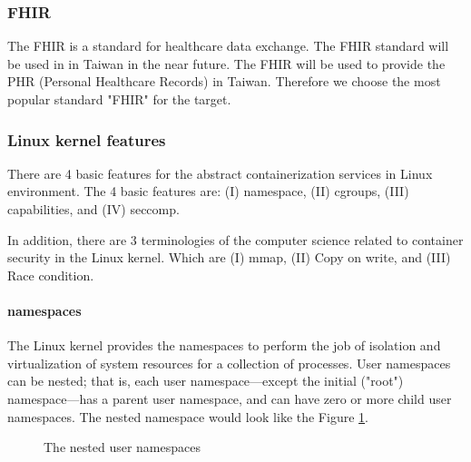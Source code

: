 \documentclass[12pt,a4paper]{IEEEconf}
\begin{document}
\subsubsection{FHIR}
The FHIR is a standard for healthcare data exchange. The FHIR standard will be used in
in Taiwan in the near future\cite{MOHW_FHIR}. The FHIR will be used to provide the PHR
(Personal Healthcare Records) in Taiwan. Therefore we choose the most popular standard
"FHIR" for the target.

\subsubsection{Linux kernel features}
There are 4 basic features for the abstract containerization services in Linux environment.
The 4 basic features are: (\RN{1}) namespace, (\RN{2}) cgroups, (\RN{3}) capabilities,
and (\RN{4}) seccomp.

In addition, there are 3 terminologies of the computer science related to container security in
the Linux kernel. Which are (\RN{1}) mmap, (\RN{2}) Copy on write, and (\RN{3}) Race condition.

\paragraph{namespaces}
The Linux kernel provides the namespaces to perform the job of isolation and virtualization
of system resources for a collection of processes\cite{Road_Ahead}.
User namespaces can be nested; that is, each user namespace—except the initial ("root")
namespace—has a parent user namespace, and can have zero or more child user namespaces.
\cite{user_namespaces}
The nested namespace would look like the Figure \ref*{Nested}.
\begin{figure}
  \centering
  \caption[]{The nested user namespaces}
  \label{Nested}
\end{figure}
\end{document}
